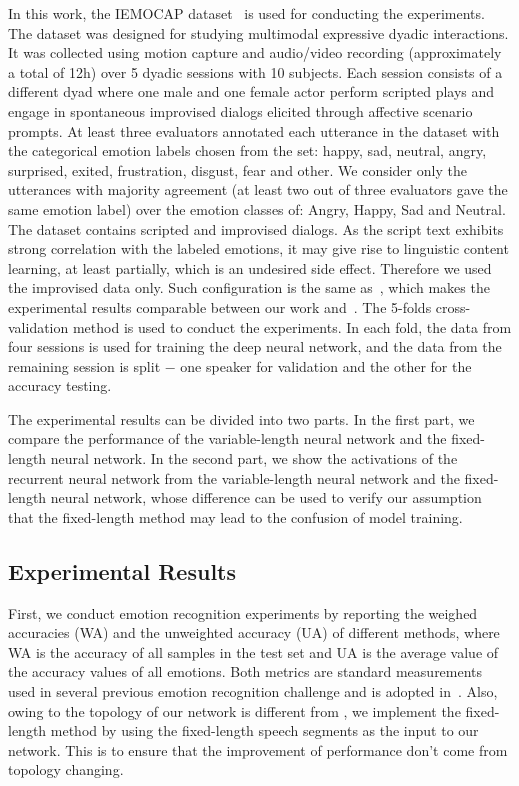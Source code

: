 \documentclass[a4paper]{article}
\begin{document}
In this work, the IEMOCAP dataset~\cite{busso2008} is used for conducting the experiments. The dataset was designed for studying multimodal expressive dyadic interactions. It was collected using motion capture and audio/video recording (approximately a total of 12h) over 5 dyadic sessions with 10 subjects. Each session consists of a different dyad where one male and one female actor perform scripted plays and engage in spontaneous improvised dialogs elicited through affective scenario prompts. At least three evaluators annotated each utterance in the dataset with the categorical emotion labels chosen from the set: happy, sad, neutral, angry, surprised, exited, frustration, disgust, fear and other. We consider only the utterances with majority agreement (at least two out of three evaluators gave the same emotion label) over the emotion classes of: Angry, Happy, Sad and Neutral. The dataset contains scripted and improvised dialogs. As the script text exhibits strong correlation with the labeled emotions, it may give rise to linguistic content learning, at least partially, which is an undesired side effect. Therefore we used the improvised data only. Such configuration is the same as~\cite{satt2017}, which makes the experimental results comparable between our work and~\cite{satt2017}. The 5-folds cross-validation method is used to conduct the experiments. In each fold, the data from four sessions is used for training the deep neural network, and the data from the remaining session is split $-$ one speaker for validation and the other for the accuracy testing.

The experimental results can be divided into two parts. In the first part, we compare the performance of the variable-length neural network and the fixed-length neural network. In the second part, we show the activations of the recurrent neural network from the variable-length neural network and the fixed-length neural network, whose difference can be used to verify our assumption that the fixed-length method may lead to the confusion of model training. 

\subsection{Experimental Results}
\label{ssec:experimental_results}
First, we conduct emotion recognition experiments by reporting the weighed accuracies (WA) and the unweighted accuracy (UA) of different methods, where WA is the accuracy of all samples in the test set and UA is the average value of the accuracy values of all emotions. Both metrics are standard measurements used in several previous emotion recognition challenge and is adopted in~\cite{satt2017}. Also, owing to the topology of our network is different from \cite{satt2017}, we implement the fixed-length method by using the fixed-length speech segments as the input to our network. This is to ensure that the improvement of performance don't come from topology changing.
\end{document}
